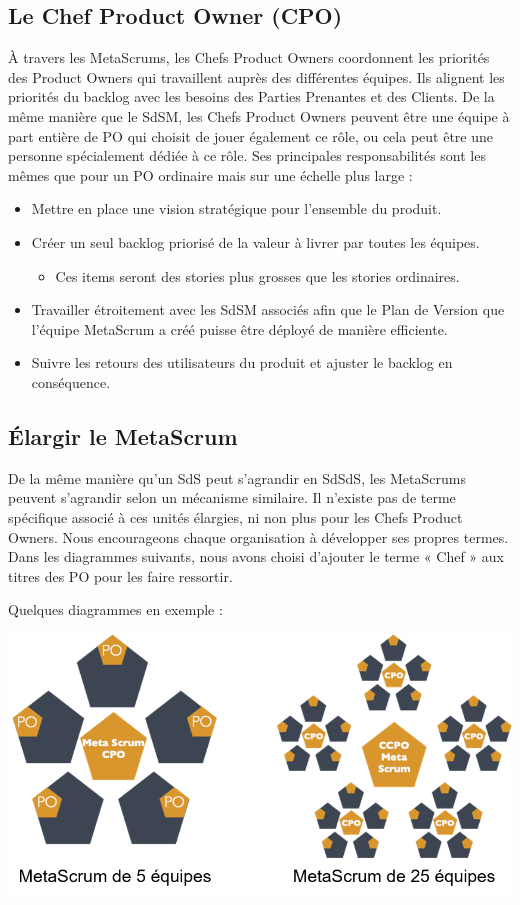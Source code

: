 \documentclass[12pt,a4paper,parskip=full]{scrartcl}
\begin{document}
\subsection{Le Chef Product Owner (CPO)}
À travers les MetaScrums, les Chefs Product Owners coordonnent les priorités des
Product Owners qui travaillent auprès des différentes équipes. Ils alignent les priorités du
backlog avec les besoins des Parties Prenantes et des Clients. De la même manière que
le SdSM, les Chefs Product Owners peuvent être une équipe à part entière de PO qui
choisit de jouer également ce rôle, ou cela peut être une personne spécialement dédiée à
ce rôle. Ses principales responsabilités sont les mêmes que pour un PO ordinaire mais sur
une échelle plus large :
\begin{itemize}
\item Mettre en place une vision stratégique pour l’ensemble du produit.
\item Créer un seul backlog priorisé de la valeur à livrer par toutes les équipes.
\begin{itemize}
\item Ces items seront des stories plus grosses que les stories ordinaires.
\end{itemize}
\item Travailler étroitement avec les SdSM associés afin que le Plan de Version que
l’équipe MetaScrum a créé puisse être déployé de manière efficiente.
\item Suivre les retours des utilisateurs du produit et ajuster le backlog en
conséquence.
\end{itemize}

\subsection{Élargir le MetaScrum}
De la même manière qu’un SdS peut s’agrandir en SdSdS, les MetaScrums peuvent
s’agrandir selon un mécanisme similaire. Il n’existe pas de terme spécifique associé à ces
unités élargies, ni non plus pour les Chefs Product Owners. Nous encourageons chaque
organisation à développer ses propres termes. Dans les diagrammes suivants, nous
avons choisi d’ajouter le terme « Chef » aux titres des PO pour les faire ressortir.

Quelques diagrammes en exemple :

\includegraphics[width=1.0\linewidth]{MetaScrum-R2.png}
\end{document}
